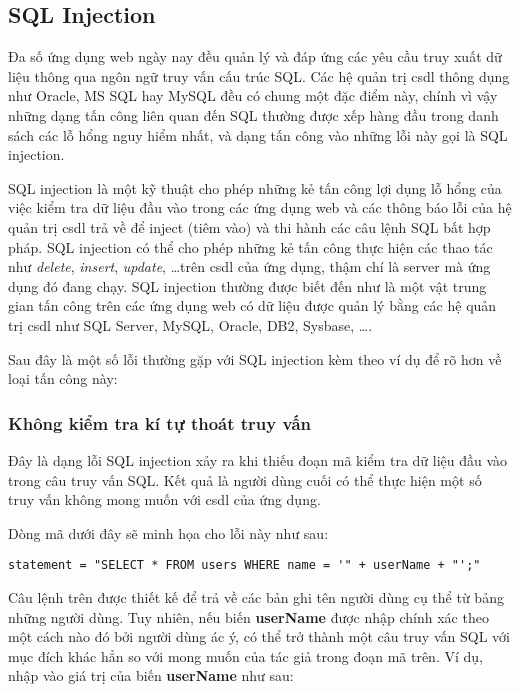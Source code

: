 \documentclass[../main-report.tex]{subfiles}
\begin{document}
\subsection{SQL Injection}
Đa số ứng dụng web ngày nay đều quản lý và đáp ứng các yêu cầu truy xuất dữ liệu
thông qua ngôn ngữ truy vấn cấu trúc SQL. Các hệ quản trị \acrfull{csdl} thông dụng
như Oracle, MS SQL hay MySQL đều có chung một đặc điểm này, chính vì vậy những
dạng tấn công liên quan đến SQL thường được xếp hàng đầu trong danh sách các lỗ hổng nguy hiểm nhất, và dạng tấn công vào những lỗi này gọi là SQL injection.

SQL injection là một kỹ thuật cho phép những kẻ tấn công lợi dụng lỗ hổng của việc kiểm tra dữ liệu đầu vào trong các ứng dụng web và các thông báo lỗi của hệ quản trị \acrshort{csdl} trả về để inject (tiêm vào) và thi hành các câu lệnh SQL bất hợp pháp. SQL injection có thể cho phép những kẻ tấn công thực hiện các thao tác như \emph{delete}, \emph{insert}, \emph{update}, \ldots trên \acrshort{csdl} của ứng dụng, thậm chí là server mà ứng dụng đó đang chạy. SQL injection thường được biết đến như là một vật trung gian tấn công trên các ứng dụng web có dữ liệu được quản lý bằng các hệ quản trị \acrshort{csdl} như SQL Server, MySQL, Oracle, DB2, Sysbase, \ldots.

Sau đây là một số lỗi thường gặp với SQL injection kèm theo ví dụ để rõ hơn về loại tấn công này:

\subsubsection*{Không kiểm tra kí tự thoát truy vấn}
Đây là dạng lỗi SQL injection xảy ra khi thiếu đoạn mã kiểm tra dữ liệu đầu vào trong câu truy vấn SQL. Kết quả là người dùng cuối có thể thực hiện một số truy vấn không mong muốn với \acrshort{csdl} của ứng dụng.

\begin{example}
Dòng mã dưới đây sẽ minh họa cho lỗi này như sau:

\begin{lstlisting}
statement = "SELECT * FROM users WHERE name = '" + userName + "';"
\end{lstlisting}
\end{example}

Câu lệnh trên được thiết kế để trả về các bản ghi tên người dùng cụ thể từ bảng những người dùng. Tuy nhiên, nếu biến \textbf{userName} được nhập chính xác theo một cách nào đó bởi người dùng ác ý, có thể trở thành một câu truy vấn SQL với mục đích khác hẳn so với mong muốn của tác giả trong đoạn mã trên. Ví dụ, nhập vào giá trị của biến \textbf{userName} như sau:
\end{document}
